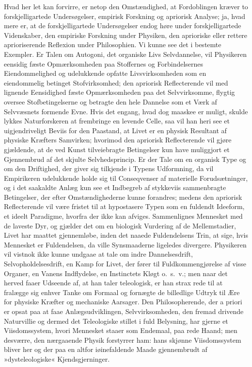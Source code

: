 \documentclass[12pt]{book}
\newcommand{\apage}[1]{\marginnote{\footnotesize\textit{[#1]}}}
\begin{document}
Hvad her let kan forvirre, er netop den Omstændighed, at Fordoblingen
kræver to forskjelligartede Undersøgelser, empirisk Forskning og apriorisk
Analyse; ja, hvad mere er, at de forskjelligartede Undersøgelser endog høre
under forskjelligartede Videnskaber, den empiriske Forskning under
Physiken, den aprioriske eller rettere aprioriserende Reflexion under
Philosophien. Vi kunne see det i bestemte Exempler. Er Talen om Autogoni,
det organiske Livs Selvdannelse, vil Physikeren eensidig fæste
Opmærksomheden paa Stoffernes og Forbindelsernes Eiendommelighed og
udelukkende opfatte Livsvirksomheden som en eiendommelig betinget
Stofvirksomhed; den apriorisk Reflecterende vil med lignende Eensidighed
fæste Opmærksomheden paa det Selvvirksomme, flygtig oversee
Stofbetingelserne og betragte den hele Dannelse som et Værk af  \apage{203} Selvvæsnets
formende Evne. Hvis det engang, hvad dog maaskee er muligt, skulde lykkes
Naturforskeren at frembringe en levende Celle, saa vil han heri see et
uigjendriveligt Beviis for den Paastand, at Livet er en physisk Resultant
af physiske Kræfters Samvirken; hvorimod den apriorisk Reflecterende vil
gjøre gjældende, at de ved Kunst tilveiebragte Betingelser kun have
muliggjort et Gjennembrud af det skjulte Selvhedsprincip. Er der Tale om en
organisk Type og om den Driftighed, der giver sig tilkjende i Typens
Udformning, da vil Empirikeren udelukkende holde sig til Conseqvenser af
materielle Forudsætninger, og i det saakaldte Anlæg kun see et Indbegreb af
stykkeviis sammenbragte Betingelser, der efter Omstændighederne kunne
forandres; medens den apriorisk Reflecterende vil være fristet til at
hypostasere Typen som en fuldendt Ideeform, et ideelt Paradigme, hvorfra
der ikke kan afviges. Sammenlignes Mennesket med de laveste Dyr, og gjælder
det om en biologisk Vurdering af de Mellemstadier, Livet har maattet
gjennemløbe, inden det naaede Fuldendelsens Trin, at sige, hvis Mennesket
er Fuldendelsen, da ville Synsmaaderne ligeledes divergere. Physikeren vil
vistnok ikke kunne undgaae at tale om indre Dannelsesdrift,
Selvopholdelsesdrift, en Kamp for Livet, der fører til Fuldkommengjørelse
af visse Organer, en Vanens Indflydelse, en Instinctets Kløgt o.\ s.\ v.; men
naar det herved faaer Udseende af, at han taler teleologisk, er han strax
rede til at fralægge sig enhver Tanke om Formaal og fornægte de billedlige
Udtryk til Ære for physiske \apage{204} Kræfter og mechaniske Aarsager. Den
Philosopherende, der a priori er opsat paa at faae Anlægsudviklingen,
Selvvirksomheden, den fremad drivende Naturvillie og dermed det
Teleologiske stillet i fuld Belysning, har gjerne et Viisdomssystem, hvori
Mennesket staaer som Endemaal, paa rede Haand; men desværre, den nærgaaende
Physik forstyrrer ham: hans skjønne Viisdomssystem bliver her og der paa en
altfor iøinefaldende Maade gjennembrudt af »dysteleologiske«
Kjendsgjerninger.
\end{document}
